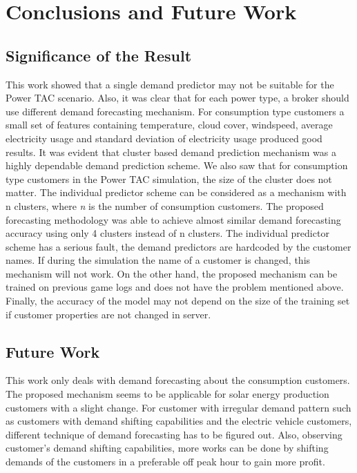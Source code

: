 
\chapter{Conclusions and Future Work}

\section{Significance of the Result}
This work showed that a single demand predictor may not be suitable for the Power TAC scenario. Also, it was clear that for each power type, a broker should use different demand forecasting mechanism. For consumption type customers a small set of features containing temperature, cloud cover, windspeed, average electricity usage and standard deviation of electricity usage produced good results. It was evident that cluster based demand prediction mechanism was a highly dependable demand prediction scheme. We also saw that for consumption type customers in the Power TAC simulation, the size of the cluster does not matter. The individual predictor scheme can be considered as a mechanism with n clusters, where \textit{n} is the number of consumption customers. The proposed forecasting methodology was able to achieve almost similar demand forecasting accuracy using only 4 clusters instead of n clusters. The individual predictor scheme has a serious fault, the demand predictors are hardcoded by the customer names. If during the simulation the name of a customer is changed, this mechanism will not work. On the other hand, the proposed mechanism can be trained on previous game logs and does not have the problem mentioned above. Finally, the accuracy of the model may not depend on the size of the training set if customer properties are not changed in server.

\section{Future Work}

This work only deals with demand forecasting about the consumption customers. The proposed mechanism seems to be applicable for solar energy production customers with a slight change. For customer with irregular demand pattern such as customers with demand shifting capabilities and the electric vehicle customers, different technique of demand forecasting has to be figured out. Also, observing customer's demand shifting capabilities, more works can be done by shifting demands of the customers in a preferable off peak hour to gain more profit.
